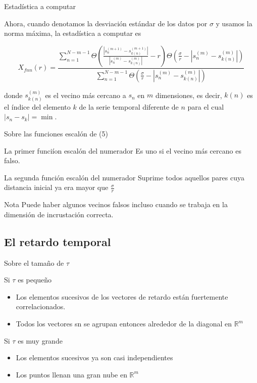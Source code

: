 \documentclass[11pt]{beamer}
\begin{document}
\begin{frame}{Estadística a computar}
	\begin{block}{}
		Ahora, cuando denotamos la desviación estándar de los datos por $\sigma$ y usamos la norma máxima, la estadística a computar es

\begin{equation}
X_{fnn}(r) = \frac{\sum_{n=1}^{N-m-1} \Theta \left( \frac{|s_{n}^{(m+1)} - s_{k(n)}^{(m+1)}|}{|s_{n}^{(m)} - s_{k(n)}^{(m)}|} - r \right) \Theta \left( \frac{\sigma}{r} - |s_{n}^{(m)} - s_{k(n)}^{(m)}| \right)}{\sum_{n=1}^{N-m-1} \Theta \left( \frac{\sigma}{r} - |s_{n}^{(m)} - s_{k(n)}^{(m)}| \right)}
\end{equation}

donde $s_{k(n)}^{(m)}$ es el vecino más cercano a $s_n$ en $m$ dimensiones, es decir, $k(n)$ es el índice del elemento $k$ de la serie temporal diferente de $n$ para el cual $|s_n - s_k| = \min$. 
	\end{block}
\end{frame}

\begin{frame}{Sobre las funciones escalón de (5)}
\begin{block}{La primer funciíon escalón del numerador}
	Es uno si el vecino más cercano es falso.
\end{block}
\begin{block}{La segunda función escalón del numerador}
	Suprime todos aquellos pares cuya distancia inicial ya era mayor que $\frac{\sigma}{r}$
\end{block}
\begin{block}{Nota}	
 Puede haber algunos vecinos falsos incluso cuando se trabaja en la dimensión de incrustación correcta.
\end{block}

\end{frame}

\subsection{El retardo temporal}
\begin{frame}{Sobre el tamaño de $\tau$}
	\begin{block}{Si $\tau$ es pequeño}
		\begin{itemize}
			\item Los elementos sucesivos de los vectores de retardo están fuertemente correlacionados. 
			\item Todos los vectores sn se agrupan entonces alrededor de la diagonal en $\mathbb{R}^m$
		\end{itemize}
	\end{block}
	\begin{block}{Si $\tau$ es muy grande}
		\begin{itemize}
			\item Los elementos sucesivos ya son casi independientes
			\item Los puntos llenan una gran nube en $\mathbb{R}^m$
		\end{itemize}
		
	\end{block}

\end{frame}
\end{document}
